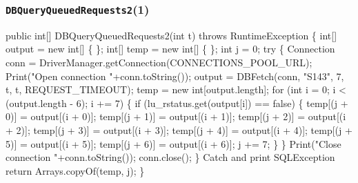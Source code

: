 \documentclass{article}
\def\nwendcode{\endtrivlist \endgroup}      %
\let\nwdocspar=\par
\theoremstyle{definition}                   %
\begin{document}
\subsubsection{{\tt{}\protect{}DBQueryQueuedRequests2}(1)}
\nwenddocs{}\plusendmoddef
public int[] DBQueryQueuedRequests2(int t) throws RuntimeException \{
  int[] output = new int[] \{ \};
  int[] temp = new int[] \{ \};
  int j = 0;
  try \{
    Connection conn = DriverManager.getConnection(CONNECTIONS_POOL_URL);
    Print("Open connection "+conn.toString());
    output = DBFetch(conn, "S143", 7, t, t, REQUEST_TIMEOUT);
    temp = new int[output.length];
    for (int i = 0; i < (output.length - 6); i += 7) \{
      if (lu_rstatus.get(output[i]) == false) \{
        temp[(j + 0)] = output[(i + 0)];
        temp[(j + 1)] = output[(i + 1)];
        temp[(j + 2)] = output[(i + 2)];
        temp[(j + 3)] = output[(i + 3)];
        temp[(j + 4)] = output[(i + 4)];
        temp[(j + 5)] = output[(i + 5)];
        temp[(j + 6)] = output[(i + 6)];
        j += 7;
      \}
    \}
    Print("Close connection "+conn.toString());
    conn.close();
  \}
  \LA{}Catch and print \code{}SQLException\edoc{}~{\nwtagstyle{}}\RA{}
  return Arrays.copyOf(temp, j);
\}
\eatline
{}\nwendcode{}\nwdocspar
\end{document}
